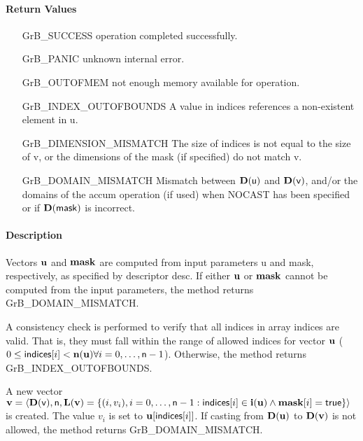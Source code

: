 \paragraph{Return Values}

\begin{itemize}[leftmargin=2.1in]
\item[{\sf GrB\_SUCCESS}]     operation completed successfully.
\item[{\sf GrB\_PANIC}]        unknown internal error.
\item[{\sf GrB\_OUTOFMEM}]    not enough memory available for operation.
\item[{\sf GrB\_INDEX\_OUTOFBOUNDS}]
        A value in {\sf indices} references a non-existent element in {\sf u}.
\item[{\sf GrB\_DIMENSION\_MISMATCH}] 
        The size of {\sf indices} is not equal to the size of {\sf v}, or
        the dimensions of the mask (if specified) do not match {\sf v}.
\item[{\sf GrB\_DOMAIN\_MISMATCH}]    Mismatch between $\bold{D}({\sf u})$ and $\bold{D}({\sf v})$, and/or the domains of the 
                                     {\sf accum} operation (if used) when {\sf NOCAST} has
                                      been specified or if $\bold{D}(\sf mask)$ is incorrect.
\end{itemize}

\paragraph{Description}

Vectors ${\bf u}$ and ${\bf mask}$ are computed from input
parameters {\sf u} and {\sf mask}, respectively, as specified by
descriptor {\sf desc}.  If either ${\bf u}$ or ${\bf mask}$
cannot be computed from the input parameters, the method returns {\sf
GrB\_DOMAIN\_MISMATCH}.

A consistency check is performed to verify that all indices in array
{\sf indices} are valid. That is, they must fall within the range of allowed
indices for vector ${\bf u}$ ($0 \leq {\sf indices}[i] < \bold{n}({\bf u})
\forall i = 0,\ldots,{\sf n}-1$).  Otherwise, the method returns {\sf
GrB\_INDEX\_OUTOFBOUNDS}.

A new vector ${\bf v} = \langle \bold{D}({\sf v}),{\sf n},
\bold{L}({\bf v}) = \{ (i,v_i), i = 0,\ldots,{\sf n}-1 : {\sf indices}[i]
\in \bold{i}({\bf u}) \wedge {\bf mask}[i] = {\sf true} \} \rangle$
is created.  The value $v_i$ is set to ${\bf u}[{\sf indices}[i]]$. If
casting from $\bold{D}({\bf u})$ to $\bold{D}({\bf v})$ is not
allowed, the method returns {\sf GrB\_DOMAIN\_MISMATCH}.

